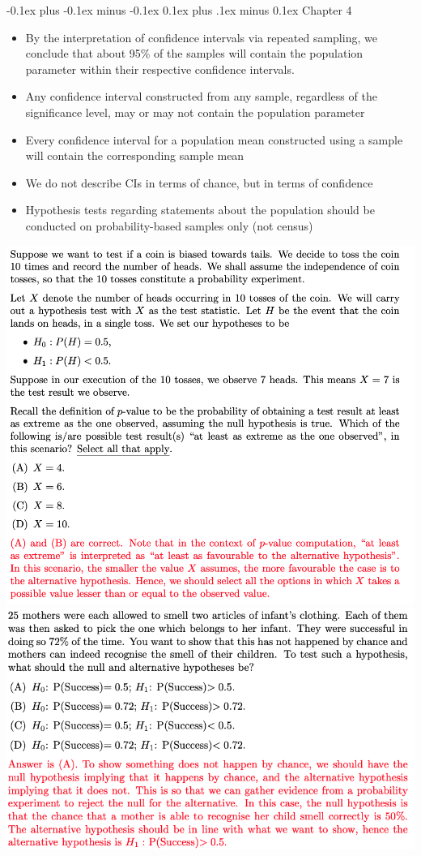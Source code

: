 \documentclass[landscape]{article}
\makeatletter
\renewcommand{\subsection}{\@startsection{subsection}{2}{0mm}%
  {-0.1ex plus -0.1ex minus -0.1ex}%
  {0.1ex plus .1ex minus 0.1ex}%
{\normalfont\scriptsize\bfseries}}
\makeatother
\begin{document}
\begin{multicols*}{5}
    \subsection{Chapter 4}
    \begin{itemize}
      \item By the interpretation of confidence intervals via repeated sampling, we conclude that about 95\% of the samples will contain the population parameter within their respective confidence intervals.
      \item Any confidence interval constructed from any sample, regardless of the significance level, may or may not contain the population parameter
      \item Every confidence interval for a population mean constructed using a sample will contain the corresponding sample mean
      \item We do not describe CIs in terms of chance, but in terms of confidence
      \item Hypothesis tests regarding statements about the population should be conducted on probability-based samples only (not census)
    \end{itemize}
    \includegraphics[width=1.0\linewidth]{9_question.png}
    \includegraphics[width=1.0\linewidth]{10_question.png}
\end{multicols*}
\end{document}
